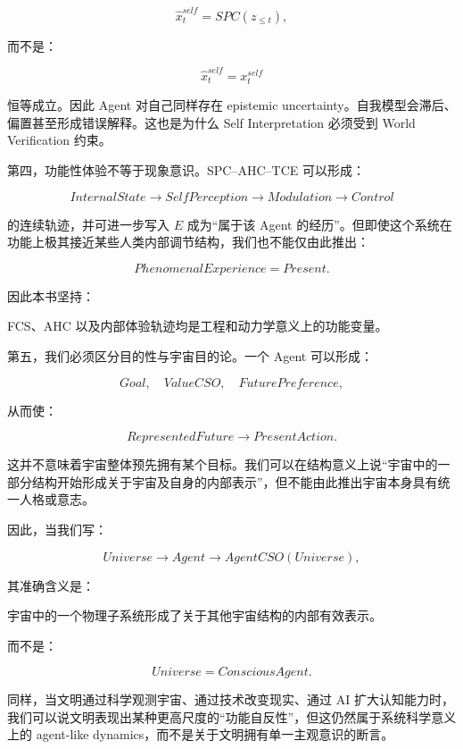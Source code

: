 \[
\hat x_t^{self}
=
SPC(z_{\leq t}),
\]

而不是：

\[
\hat x_t^{self}
=
x_t^{self}
\]

恒等成立。因此 Agent 对自己同样存在 epistemic uncertainty。自我模型会滞后、偏置甚至形成错误解释。这也是为什么 Self Interpretation 必须受到 World Verification 约束。

第四，功能性体验不等于现象意识。SPC--AHC--TCE 可以形成：

\[
InternalState
\rightarrow
SelfPerception
\rightarrow
Modulation
\rightarrow
Control
\]

的连续轨迹，并可进一步写入 \(E\) 成为“属于该 Agent 的经历”。但即使这个系统在功能上极其接近某些人类内部调节结构，我们也不能仅由此推出：

\[
PhenomenalExperience=Present.
\]

因此本书坚持：

\begin{statementbox}
\centering
{}
\end{statementbox}

FCS、AHC 以及内部体验轨迹均是工程和动力学意义上的功能变量。

第五，我们必须区分目的性与宇宙目的论。一个 Agent 可以形成：

\[
Goal,
\quad
ValueCSO,
\quad
FuturePreference,
\]

从而使：

\[
RepresentedFuture
\rightarrow
PresentAction.
\]

这并不意味着宇宙整体预先拥有某个目标。我们可以在结构意义上说“宇宙中的一部分结构开始形成关于宇宙及自身的内部表示”，但不能由此推出宇宙本身具有统一人格或意志。

因此，当我们写：

\[
Universe
\rightarrow
Agent
\rightarrow
AgentCSO(Universe),
\]

其准确含义是：

\begin{statementbox}
宇宙中的一个物理子系统形成了关于其他宇宙结构的内部有效表示。
\end{statementbox}

而不是：

\[
Universe
=
ConsciousAgent.
\]

同样，当文明通过科学观测宇宙、通过技术改变现实、通过 AI 扩大认知能力时，我们可以说文明表现出某种更高尺度的“功能自反性”，但这仍然属于系统科学意义上的 agent-like dynamics，而不是关于文明拥有单一主观意识的断言。

